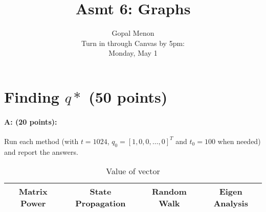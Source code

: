 \documentclass[11pt]{article}
\title{Asmt 6: Graphs}
\author{Gopal Menon\\Turn in through Canvas by 5pm: \\
Monday, May 1}
\date{}
\begin{document}
\maketitle


%
\section{Finding $q*$ (50 points)}
\paragraph{A: (20 points):} 
Run each method (with $t = 1024$, $q_0 = [1, 0, 0, \ldots, 0]^T$ and $t_0 = 100$ when needed) and report the answers.

    \begin{table}[!h] 
    \centering
    \label{6A}
    \caption{Value of vector}
    \begin{tabular}{|c|c|c|c|}
      \hline
    Matrix Power & State Propagation & Random Walk & Eigen Analysis  \\
      \hline        
      

\end{tabular}
\end{table}
\end{document}
